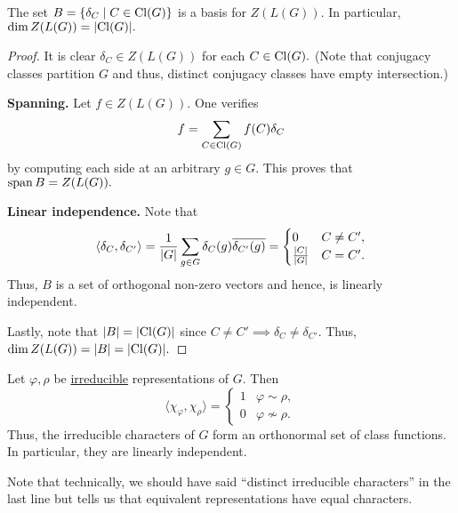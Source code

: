 \begin{prop} \label{prop:dimZLGCLG}
	The set $B = \{\delta_C \mid C \in \operatorname{Cl}(G)\}$ is a basis for $Z(L(G)).$ In particular, $\dim Z(L(G)) = {\left\lvert \operatorname{Cl}(G) \right\lvert}.$
\end{prop}
\begin{proof} 
	It is clear $\delta_C \in Z(L(G))$ for each $C \in \operatorname{Cl}(G).$ (Note that conjugacy classes partition $G$ and thus, distinct conjugacy classes have empty intersection.)

	\textbf{Spanning.} Let $f \in Z(L(G)).$ One verifies
	\begin{equation*} 
		f = \sum_{C \in \operatorname{Cl}(G)} f(C)\delta_C
	\end{equation*}
	by computing each side at an arbitrary $g \in G.$ This proves that $\operatorname{span} B = Z(L(G)).$

	\textbf{Linear independence.} Note that
	\begin{equation*} 
		\langle \delta_C, \delta_{C'}\rangle = \frac{1}{{\left\lvert G \right\lvert}}\sum_{g \in G} \delta_C(g)\overline{\delta_{C'}(g)} = \begin{cases}
			0 & C \neq C',\\
			\frac{{\left\lvert C \right\lvert}}{{\left\lvert G \right\lvert}} & C = C'.
		\end{cases}
	\end{equation*}
	Thus, $B$ is a set of orthogonal non-zero vectors and hence, is linearly independent.

	Lastly, note that ${\left\lvert B \right\lvert} = {\left\lvert \operatorname{Cl}(G) \right\lvert}$ since $C \neq C' \implies \delta_C \neq \delta_{C'}.$ Thus, $\dim Z(L(G)) = {\left\lvert B \right\lvert} = {\left\lvert \operatorname{Cl}(G) \right\lvert}.$
\end{proof}

\begin{thm} \label{thm:firstorthorel}
	Let $\varphi, \rho$ be \underline{irreducible} representations of $G.$ Then
	\begin{equation*} 
		\langle \chi_\varphi, \chi_\rho\rangle = \begin{cases}
			1 & \varphi \sim \rho,\\
			0 & \varphi \not\sim \rho.
		\end{cases}
	\end{equation*}
	Thus, the irreducible characters of $G$ form an orthonormal set of class functions. In particular, they are linearly independent.	
\end{thm}
Note that technically, we should have said ``distinct irreducible characters'' in the last line but  tells us that equivalent representations have equal characters.


